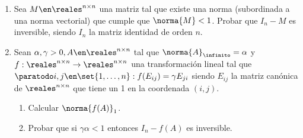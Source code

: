 \begin{enunciado}{\ejExtra}
  \begin{enumerate}[label=(\alph*)]
    \item
          Sea $M \en \reales^{n \times n}$ una matriz tal que
          existe una norma (subordinada a una norma vectorial)
          que cumple que $\norma{M} < 1$. Probar que $I_n - M$ es inversible,
          siendo $I_n$ la matriz identidad de orden $n$.

    \item
          Sean $\alpha, \gamma > 0, A \en \reales^{n \times n}$ tal que
          $\norma{A}_\infinito = \alpha$ y $f : \reales^{n \times n} \to \reales^{n \times n}$
          una transformación lineal tal que
          $\paratodo i,j \en \set{1,\ldots, n} : f(E_{ij}) = \gamma E_{ji}$ siendo $E_{ij}$ la matriz canónica de
          $\reales^{n \times n}$ que tiene un 1 en la coordenada $(i, j)$.
          \begin{enumerate}[label=\roman*)]
            \item Calcular $\norma{f(A)}_1$.
            \item Probar que si $\gamma \alpha < 1$ entonces $I_n - f(A)$ es inversible.
          \end{enumerate}
  \end{enumerate}
\end{enunciado}

